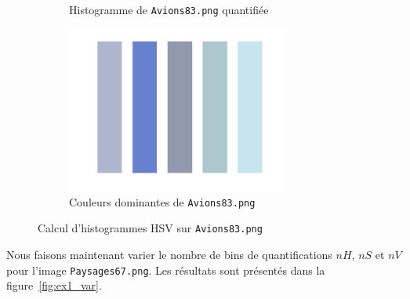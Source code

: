 \documentclass[a4paper]{article}
\newcommand{\figref}[1]{figure~\ref{#1}}
\begin{document}
\begin{figure}[H]
\begin{subfigure}[c]{0.46\textwidth}
        \caption{Histogramme de \texttt{Avions83.png} quantifiée}
    \end{subfigure}
    \begin{subfigure}[c]{0.46\textwidth}
        \centering
        \includegraphics[width=0.8\textwidth]{images/Avions83_domi.png}
        \caption{Couleurs dominantes de \texttt{Avions83.png}}
    \end{subfigure}

    \caption{Calcul d'histogrammes HSV sur \texttt{Avions83.png}} 
    \label{fig:ex1_Avions83}
\end{figure}

Nous faisons maintenant varier le nombre de bins de quantifications $nH$, $nS$
et $nV$ pour l'image \texttt{Paysages67.png}. Les résultats sont présentés dans la \figref{fig:ex1_var}.
\end{document}
